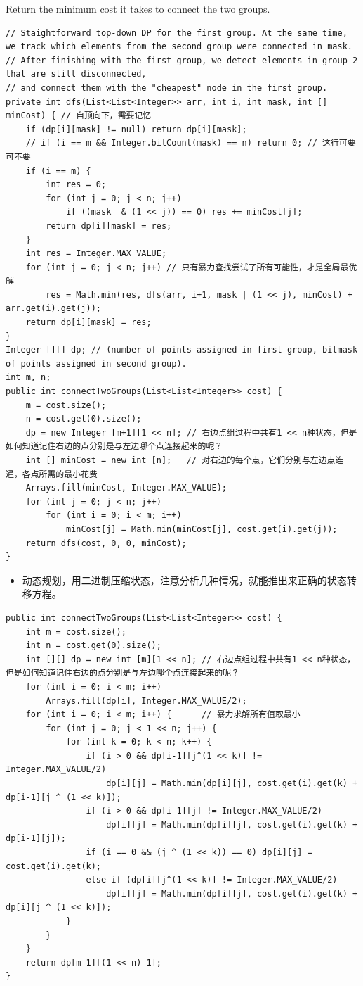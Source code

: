 \documentclass[9pt, b5paaper]{book}
\begin{document}
Return the minimum cost it takes to connect the two groups.
\begin{verbatim}
// Staightforward top-down DP for the first group. At the same time, we track which elements from the second group were connected in mask.
// After finishing with the first group, we detect elements in group 2 that are still disconnected,
// and connect them with the "cheapest" node in the first group.
private int dfs(List<List<Integer>> arr, int i, int mask, int [] minCost) { // 自顶向下，需要记忆
    if (dp[i][mask] != null) return dp[i][mask];
    // if (i == m && Integer.bitCount(mask) == n) return 0; // 这行可要可不要
    if (i == m) {       
        int res = 0;
        for (int j = 0; j < n; j++) 
            if ((mask  & (1 << j)) == 0) res += minCost[j];
        return dp[i][mask] = res;
    }
    int res = Integer.MAX_VALUE;
    for (int j = 0; j < n; j++) // 只有暴力查找尝试了所有可能性，才是全局最优解
        res = Math.min(res, dfs(arr, i+1, mask | (1 << j), minCost) + arr.get(i).get(j));
    return dp[i][mask] = res;
}
Integer [][] dp; // (number of points assigned in first group, bitmask of points assigned in second group).
int m, n;
public int connectTwoGroups(List<List<Integer>> cost) {
    m = cost.size();
    n = cost.get(0).size();
    dp = new Integer [m+1][1 << n]; // 右边点组过程中共有1 << n种状态，但是如何知道记住右边的点分别是与左边哪个点连接起来的呢？
    int [] minCost = new int [n];   // 对右边的每个点，它们分别与左边点连通，各点所需的最小花费
    Arrays.fill(minCost, Integer.MAX_VALUE);
    for (int j = 0; j < n; j++) 
        for (int i = 0; i < m; i++) 
            minCost[j] = Math.min(minCost[j], cost.get(i).get(j));
    return dfs(cost, 0, 0, minCost);
}
\end{verbatim}
\begin{itemize}
\item 动态规划，用二进制压缩状态，注意分析几种情况，就能推出来正确的状态转移方程。
\end{itemize}
\begin{verbatim}
public int connectTwoGroups(List<List<Integer>> cost) { 
    int m = cost.size();
    int n = cost.get(0).size();
    int [][] dp = new int [m][1 << n]; // 右边点组过程中共有1 << n种状态，但是如何知道记住右边的点分别是与左边哪个点连接起来的呢？
    for (int i = 0; i < m; i++) 
        Arrays.fill(dp[i], Integer.MAX_VALUE/2);
    for (int i = 0; i < m; i++) {      // 暴力求解所有值取最小
        for (int j = 0; j < 1 << n; j++) {
            for (int k = 0; k < n; k++) {
                if (i > 0 && dp[i-1][j^(1 << k)] != Integer.MAX_VALUE/2) 
                    dp[i][j] = Math.min(dp[i][j], cost.get(i).get(k) + dp[i-1][j ^ (1 << k)]);
                if (i > 0 && dp[i-1][j] != Integer.MAX_VALUE/2)
                    dp[i][j] = Math.min(dp[i][j], cost.get(i).get(k) + dp[i-1][j]);
                if (i == 0 && (j ^ (1 << k)) == 0) dp[i][j] = cost.get(i).get(k);
                else if (dp[i][j^(1 << k)] != Integer.MAX_VALUE/2)
                    dp[i][j] = Math.min(dp[i][j], cost.get(i).get(k) + dp[i][j ^ (1 << k)]);
            }
        }
    }
    return dp[m-1][(1 << n)-1];
}
\end{verbatim}
\end{document}
